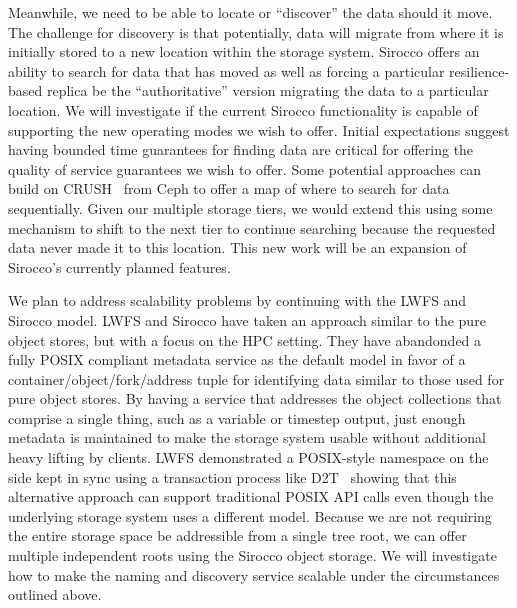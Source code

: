 Meanwhile, we need to be able to locate or ``discover'' the data should it
move.  The challenge for discovery is that potentially, data will migrate from
where it is initially stored to a new location within the storage system.
Sirocco offers an ability to search for data that has moved as well as forcing
a particular resilience-based replica be the ``authoritative'' version
migrating the data to a particular location. We will investigate if the current
Sirocco functionality is capable of supporting the new operating modes we wish
to offer. Initial expectations suggest having bounded time guarantees for
finding data are critical for offering the quality of service guarantees we
wish to offer. Some potential approaches can build on CRUSH~\cite{weil:ceph}
from Ceph to offer a map of where to search for data sequentially. Given our
multiple storage tiers, we would extend this using some mechanism to shift to
the next tier to continue searching because the requested data never made it to
this location. This new work will be an expansion of Sirocco's currently
planned features.

We plan to address scalability problems by continuing with the LWFS and Sirocco
model. LWFS and Sirocco have taken an approach similar to the pure object
stores, but with a focus on the HPC setting. They have abandonded a fully POSIX
compliant metadata service as the default model in favor of a
container/object/fork/address tuple for identifying data similar to those used
for pure object stores. By having a service that addresses the object
collections that comprise a single thing, such as a variable or timestep
output, just enough metadata is maintained to make the storage system usable
without additional heavy lifting by clients.  LWFS demonstrated a POSIX-style
namespace on the side kept in sync using a transaction process like
D2T~\cite{lofstead:2012:txn} showing that this alternative approach can support
traditional POSIX API calls even though the underlying storage system uses a
different model. Because we are not requiring the entire storage space be
addressible from a single tree root, we can offer multiple independent roots
using the Sirocco object storage. We will investigate how to make the naming
and discovery service scalable under the circumstances outlined above.

